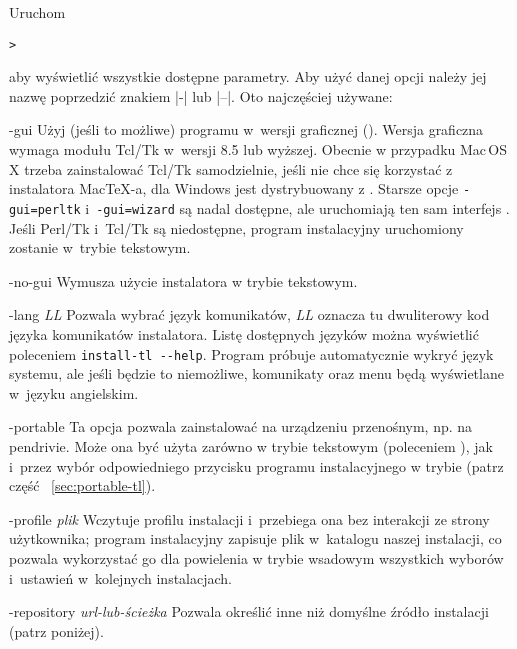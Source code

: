 \documentclass{article}
\let\textsl\textit
\begin{document}
Uruchom
\begin{alltt}
> 
\end{alltt}
aby wyświetlić wszystkie dostępne parametry. Aby użyć danej opcji należy jej
nazwę poprzedzić znakiem |-| lub |--|.  Oto najczęściej używane:

\begin{ttdescription}
\item[-gui] Użyj (jeśli to możliwe) programu w~wersji graficznej (\GUI). Wersja graficzna wymaga
 modułu Tcl/Tk w~wersji 8.5 lub wyższej.  Obecnie w przypadku Mac\,OS\,X trzeba zainstalować Tcl/Tk samodzielnie, jeśli nie chce się korzystać z instalatora  Mac\TeX-a, dla Windows jest
 dystrybuowany z \TL. Starsze opcje  \texttt{-gui=perltk} i~\texttt{-gui=wizard} są nadal dostępne,
 ale uruchomiają ten sam interfejs \GUI{}. Jeśli  Perl/Tk i~Tcl/Tk są niedostępne,
 program instalacyjny uruchomiony zostanie w~trybie tekstowym.

\item[-no-gui] Wymusza użycie instalatora w trybie tekstowym.

\item[-lang {\sl LL}] Pozwala wybrać język komunikatów,
 \textsl{LL} oznacza tu dwuliterowy kod języka komunikatów instalatora. Listę dostępnych
 języków można wyświetlić poleceniem  \verb|install-tl --help|.
 Program próbuje automatycznie wykryć język systemu, ale jeśli będzie to niemożliwe,
 komunikaty oraz menu będą wyświetlane w~języku angielskim.

\item[-portable] Ta opcja pozwala zainstalować \TL{} na urządzeniu przenośnym, np. na pendrivie.
 Może ona być użyta zarówno w trybie tekstowym (poleceniem ),
 jak i~przez wybór odpowiedniego przycisku programu instalacyjnego w trybie
 \GUI{} (patrz część ~\ref{sec:portable-tl}).

\item[-profile {\sl plik}] Wczytuje  profilu instalacji
 i~przebiega ona bez interakcji ze strony użytkownika; program
 instalacyjny zapisuje plik  w~katalogu
  naszej instalacji, co pozwala wykorzystać go dla
 powielenia w trybie wsadowym wszystkich wyborów i~ustawień w~kolejnych
 instalacjach.

\item [-repository {\sl url-lub-ścieżka}] Pozwala określić inne niż
 domyślne źródło instalacji (patrz poniżej).


\end{ttdescription}
\end{document}
